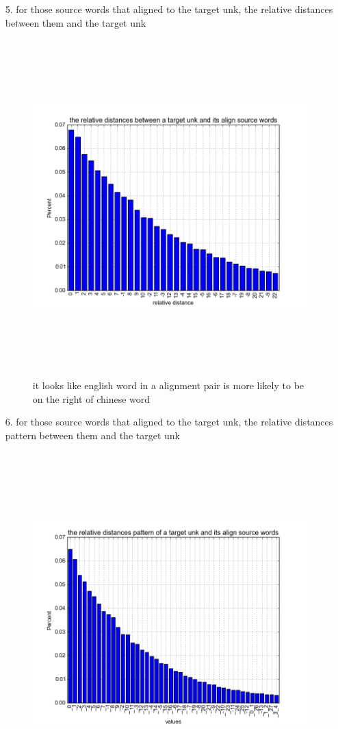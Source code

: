 \documentclass{article}
\begin{document}
\begin{itemize}
\newpage
\item[5. ] for those source words that aligned to the target unk, the relative distances between them and the target unk
\begin{figure}[H]
\centering
\includegraphics[height=13.0cm]{figure_4.png}
\caption{it looks like english word in a alignment pair is more likely to be on the right of chinese word  }
\end{figure}
\newpage
\item[6. ] for those source words that aligned to the target unk, the relative distances pattern between them and the target unk
\begin{figure}[H]
\centering
\includegraphics[height=13.0cm]{figure_5.png}

\end{figure}
\end{itemize}
\end{document}
